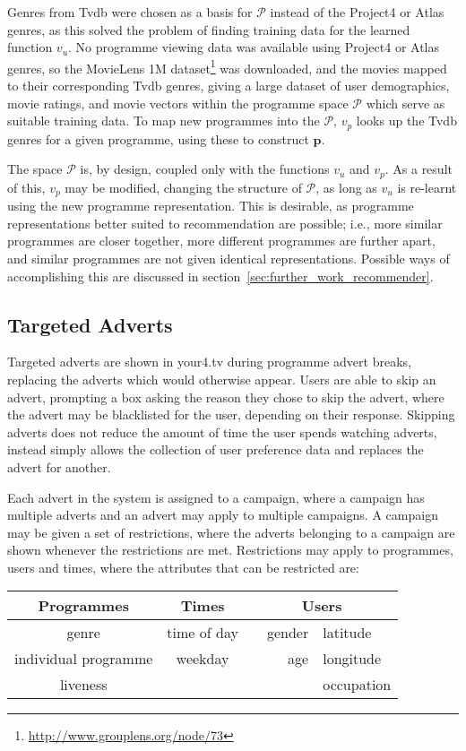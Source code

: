 Genres from Tvdb were chosen as a basis for $\mathcal{P}$ instead of the Project4 or Atlas genres, as this solved the problem of finding training data for the learned function $v_u$. No programme viewing data was available using Project4 or Atlas genres, so the MovieLens 1M dataset\footnote{\url{http://www.grouplens.org/node/73}} was downloaded, and the movies mapped to their corresponding Tvdb genres, giving a large dataset of user demographics, movie ratings, and movie vectors within the programme space $\mathcal{P}$ which serve as suitable training data. To map new programmes into the $\mathcal{P}$, $v_p$ looks up the Tvdb genres for a given programme, using these to construct $\mathbf{p}$.

The space $\mathcal{P}$ is, by design, coupled only with the functions $v_u$ and $v_p$. As a result of this, $v_p$ may be modified, changing the structure of $\mathcal{P}$, as long as $v_u$ is re-learnt using the new programme representation. This is desirable, as programme representations better suited to recommendation are possible; i.e., more similar programmes are closer together, more different programmes are further apart, and similar programmes are not given identical representations. Possible ways of accomplishing this are discussed in section~\ref{sec:further_work_recommender}.

\subsection{Targeted Adverts}
\label{sec:design_adverts}

Targeted adverts are shown in your4.tv during programme advert breaks, replacing the adverts which would otherwise appear. Users are able to skip an advert, prompting a box asking the reason they chose to skip the advert, where the advert may be blacklisted for the user, depending on their response. Skipping adverts does not reduce the amount of time the user spends watching adverts, instead simply allows the collection of user preference data and replaces the advert for another.

Each advert in the system is assigned to a campaign, where a campaign has multiple adverts and an advert may apply to multiple campaigns. A campaign may be given a set of restrictions, where the adverts belonging to a campaign are shown whenever the restrictions are met. Restrictions may apply to programmes, users and times, where the attributes that can be restricted are:

\begin{center}
	\begin{tabular}{c c r l}
		\toprule
		\textbf{Programmes} & \textbf{Times} & \multicolumn{2}{c}{\textbf{Users}} \\
		\midrule
		genre & time of day & ~~gender & latitude \\ %
		individual programme & weekday & age & longitude \\
		liveness & & &  occupation \\
		\bottomrule
	\end{tabular}
\end{center}

